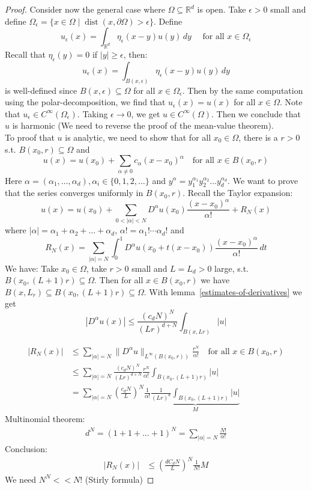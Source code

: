 \documentclass{report}
\theoremstyle{tommy}
\newcommand{\dist}{\operatorname{dist}}
\begin{document}
\begin{proof}
  Consider now the general case where \(\Omega \subseteq \mathbb{R}^d\) is open. Take \(\epsilon > 0\) small and define \(\Omega_\epsilon = \{x \in \Omega \mid \dist(x, \partial \Omega) > \epsilon\}\). 
  Define \[u_\epsilon(x) = \int_{\mathbb{R}^d} \eta_\epsilon(x-y) u(y) \, dy \quad \text{ for all } x \in \Omega_\epsilon\]
  Recall that \(\eta_\epsilon(y) = 0\) if \(|y| \ge \epsilon\), then:
  \[u_\epsilon(x) = \int_{B(x, \epsilon)} \eta_\epsilon(x-y)u(y) \, dy\]
  is well-defined since \(B(x,\epsilon) \subseteq \Omega\) for all \(x \in \Omega_\epsilon\).
  Then by the same computation using the polar-decomposition, we find that \(u_\epsilon(x) = u(x)\) for all \(x \in \Omega\). Note that \(u_\epsilon \in C^\infty(\Omega_\epsilon)\). Taking \(\epsilon \to 0\), we get \(u \in C^\infty(\Omega)\). Then we conclude that \(u\) is harmonic (We need to reverse the proof of the mean-value theorem).\\
  To proof that \(u\) is analytic, we need to show that for all \(x_0 \in \Omega\), there is a \(r > 0\) s.t. \(B(x_0, r) \subseteq \Omega\) and \[u(x) = u(x_0) + \sum_{\alpha \ne 0} c_\alpha(x-x_0)^\alpha \quad \text{for  all } x \in B(x_0, r)\]
  Here \(\alpha = (\alpha_1, \dots, \alpha_d), \alpha_i \in \{0, 1, 2, \dots\}\) and \(y^\alpha = y_1^{\alpha_1}y_2^{\alpha_2} \dots y_d^{\alpha_d}\). 
  We want to prove that the series converges uniformly in \(B(x_0, r)\). Recall the Taylor expansion:
  \[u(x) = u(x_0) + \sum_{0 < |\alpha| < N} D^\alpha u(x_0) \frac{(x-x_0)^\alpha}{\alpha!} + R_N(x)\]
  where \(|\alpha| = \alpha_1 + \alpha_2 + \dots + \alpha_d\), \(\alpha! = \alpha_1! \cdots \alpha_d!\) and \[R_N(x) = \sum_{|\alpha| = N} \int_0^1 D^\alpha u(x_0 + t(x-x_0)) \frac{(x-x_0)^\alpha}{\alpha!} \, dt\]
  We have: Take \(x_0 \in \Omega\), take \(r > 0\) small and \(L = L_d > 0\) large, s.t. \(B(x_0, (L+1) r) \subseteq \Omega\). Then for all \(x \in B(x_0, r)\) we have \(B(x, L_r) \subseteq B(x_0, (L+1)r) \subseteq \Omega\). With lemma~\ref{estimates-of-derivatives} we get
  \[|D^\alpha u(x)| \le \frac{(c_d N)^N}{(Lr)^{d+N}} \int_{B(x, Lr)} |u|\]

  \begin{align*}
    |R_N(x)| 
    &\le \sum_{|\alpha| = N} \|D^\alpha u\|_{L^\infty(B(x_0, r))} \frac{r^N}{\alpha!} \quad \text{for all } x \in B(x_0, r) \\
    &\le \sum_{|\alpha| = N} \frac{(c_d N)^N}{(Lr)^{d+N}} \frac{r^N}{\alpha!} \int_{B(x_0, (L+1) r)} |u| \\
    &= \sum_{|\alpha| = N} \left(\frac{c_d N}{L}\right)^N \frac{1}{\alpha!} \underbrace{ \frac{1}{(Lr)^d} \int_{B(x_0, (L+1)r)} |u|}_{M}
  \end{align*}
  Multinomial theorem:
  \begin{align*}
    d^N = (1+1+ \dots + 1)^N = \sum_{|\alpha| = N} \frac{N!}{\alpha!}
  \end{align*}
  Conclusion:
  \begin{align*}
    |R_N(x)| 
    &\le \left(\frac{d C_d N}{L}\right)^N \frac{1}{N!} M
  \end{align*}
  We need \(N^N << N!\) (Stirly formula)
\end{proof}
\end{document}
